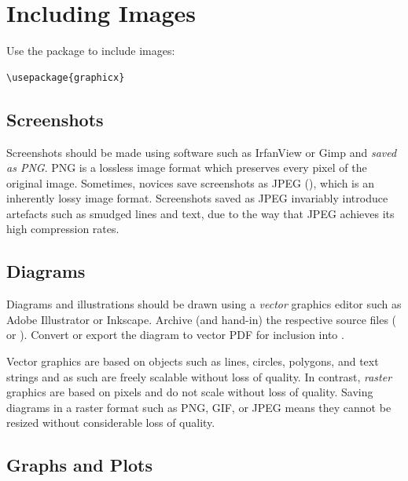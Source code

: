 \section{Including Images}

Use the  package to include images:
\begin{samepage}
\begin{lstlisting}
\usepackage{graphicx}
\end{lstlisting}
\end{samepage}



\subsection{Screenshots}

Screenshots should be made using software such as IrfanView or Gimp
and \emph{saved as PNG}. PNG is a lossless image format which
preserves every pixel of the original image. Sometimes, novices save
screenshots as JPEG (), which is an inherently lossy image
format. Screenshots saved as JPEG invariably introduce artefacts such
as smudged lines and text, due to the way that JPEG achieves its high
compression rates.




\subsection{Diagrams}

Diagrams and illustrations should be drawn using a \emph{vector}
graphics editor such as Adobe Illustrator or
Inkscape\parencite{Inkscape}. Archive (and hand-in) the respective source
files ( or ). Convert or export the diagram to
vector PDF for inclusion into \LaTeXe.

Vector graphics are based on objects such as lines, circles, polygons,
and text strings and as such are freely scalable without loss of
quality. In contrast, \emph{raster} graphics are based on pixels and
do not scale without loss of quality. Saving diagrams in a raster
format such as PNG, GIF, or JPEG means they cannot be resized without
considerable loss of quality.





\subsection{Graphs and Plots}


